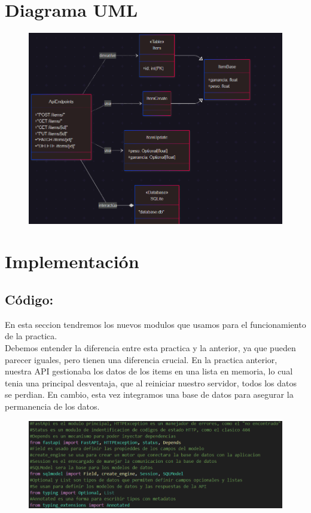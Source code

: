 \documentclass[12pt]{article}
\begin{document}
\section{Diagrama UML}
\begin{figure}[H]
    \centering
    \includegraphics[width=1\textwidth]{Imagenes/Diagrama.png}
\end{figure}


\section{Implementación}
\subsection*{Código:}
En esta seccion tendremos los nuevos modulos que usamos para el funcionamiento de la practica.\\

Debemos entender la diferencia entre esta practica y la anterior, ya que pueden parecer iguales, pero tienen una diferencia crucial. 
En la practica anterior, nuestra API gestionaba los datos de los items en una lista en memoria, lo cual tenia una principal desventaja,
que al reiniciar nuestro servidor, todos los datos se perdian. 
En cambio, esta vez integramos una base de datos para asegurar la permanencia de los datos.

\begin{figure}[H]
    \centering
    \includegraphics[width=1\textwidth]{Imagenes/Imagen WEB 3_1.png}
\end{figure}
\end{document}
